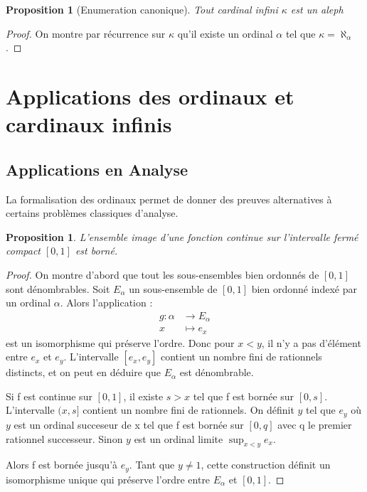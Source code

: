 \documentclass{article}
\theoremstyle{definition}
\theoremstyle{plain}
\newtheorem{proposition}[subsubsection]{Proposition}
\theoremstyle{plain}
\theoremstyle{plain}
\theoremstyle{plain}
\theoremstyle{plain}
\begin{document}
\begin{proposition}[Enumeration canonique]
	Tout cardinal infini \( \kappa \) est un aleph
\end{proposition}

\begin{proof}
	On montre par récurrence sur \( \kappa \) qu'il existe un ordinal \( \alpha \) tel que \( \kappa = \aleph_{\alpha} \).
\end{proof}
\clearpage

\section{Applications des ordinaux et cardinaux infinis}
\subsection{Applications en Analyse}

\par La formalisation des ordinaux permet de donner des preuves alternatives à certains problèmes classiques d'analyse.

\begin{proposition}
	L'ensemble image d'une fonction continue sur l'intervalle fermé compact \( [0,1] \) est borné.
\end{proposition}

\begin{proof}
	On montre d'abord que tout les sous-ensembles bien ordonnés de \( [0,1] \) sont dénombrables. Soit \( E_{\alpha} \) un sous-ensemble de \( [0,1] \) bien ordonné indexé par un ordinal \( \alpha \). Alors l'application :
\begin{align*}	
	g : \alpha &\rightarrow E_{\alpha} \\
	x &\mapsto e_{x}
\end{align*}
est un isomorphisme qui préserve l'ordre. Donc pour \( x < y \), il n'y a pas d'élément entre \( e_{x} \) et \( e_{y} \). L'intervalle \( [e_{x},e_{y}] \) contient un nombre fini de rationnels distincts, et on peut en déduire que \( E_{\alpha} \) est dénombrable.

Si f est continue sur \( [0,1] \), il existe \( s > x \) tel que f est bornée sur \( [0,s] \). L'intervalle \( (x,s] \) contient un nombre fini de rationnels. On définit \( y \) tel que \( e_{y} \) où \( y \) est un ordinal succeseur de x tel que f est bornée sur \( [0,q] \) avec q le premier rationnel successeur. Sinon \( y \) est un ordinal limite \( \sup_{x<y} e_{x} \). 

Alors f est bornée jusqu'à \( e_{y} \). Tant que \( y \neq 1 \), cette construction définit un isomorphisme unique qui préserve l'ordre entre \( E_{\alpha} \) et \( [0,1] \).
\end{proof}

\clearpage
\printbibliography
\end{document}
